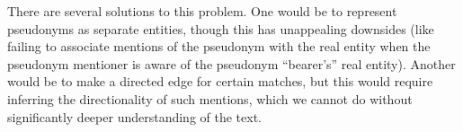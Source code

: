 There are several solutions to this problem. One would be to represent pseudonyms as separate entities, though this has unappealing downsides (like failing to associate mentions of the pseudonym with the real entity when the pseudonym mentioner is aware of the pseudonym ``bearer's'' real entity). Another would be to make a directed edge for certain matches, but this would require inferring the directionality of such mentions, which we cannot do without significantly deeper understanding of the text.
